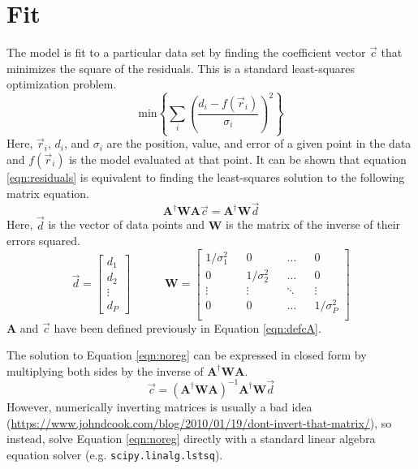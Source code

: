 \documentclass[12pt,letterpaper]{article}
\newcommand{\mat}[1]{\mathbf{#1}}
\newcommand{\plaintext}[1]{\texttt{#1}}
\begin{document}
\section{Fit}
  The model is fit to a particular data set by finding the coefficient vector \(\vec{c}\) that minimizes the square of the residuals.  This is a standard least-squares optimization problem.
  \begin{equation}
    \label{eqn:residuals}
    \text{min}\left\{\sum_i\left(\frac{d_i-f(\vec{r}_i)}{\sigma_i}\right)^2\right\}
  \end{equation}
  Here, \(\vec{r}_i\), \(d_i\), and \(\sigma_i\) are the position, value, and error of a given point in the data and \(f(\vec{r}_i)\) is the model evaluated at that point.  It can be shown that equation \ref{eqn:residuals} is equivalent to finding the least-squares solution to the following matrix equation.
  \begin{equation}
    \label{eqn:noreg}
    \mat{A}^\dagger\mat{W}\mat{A}\vec{c} = \mat{A}^\dagger\mat{W}\vec{d}
  \end{equation}
  Here, \(\vec{d}\) is the vector of data points and \(\mat{W}\) is the matrix of the inverse of their errors squared.
  \begin{equation}
    \vec{d} = \begin{bmatrix}
                d_1 \\
                d_2 \\
                \vdots \\
                d_P
              \end{bmatrix} \quad\quad\quad
    \mat{W} = \begin{bmatrix}
                1/\sigma_1^2 && 0 && \hdots && 0 \\
                0 && 1/\sigma_2^2 && \hdots && 0 \\
                \vdots && \vdots && \ddots && \vdots \\
                0 && 0 && \hdots && 1/\sigma_P^2 \\
              \end{bmatrix}
  \end{equation}
  \(\mat{A}\) and \(\vec{c}\) have been defined previously in Equation \ref{eqn:defcA}.

  The solution to Equation \ref{eqn:noreg} can be expressed in closed form by multiplying both sides by the inverse of \(\mat{A}^\dagger\mat{W}\mat{A}\). 
  \begin{equation}
    \vec{c} = (\mat{A}^\dagger\mat{W}\mat{A})^{-1}\mat{A}^\dagger\mat{W}\vec{d}
  \end{equation}
  However, numerically inverting matrices is usually a bad idea (\url{https://www.johndcook.com/blog/2010/01/19/dont-invert-that-matrix/}), so instead, solve Equation \ref{eqn:noreg} directly with a standard linear algebra equation solver (e.g. \plaintext{scipy.linalg.lstsq}).
\end{document}
